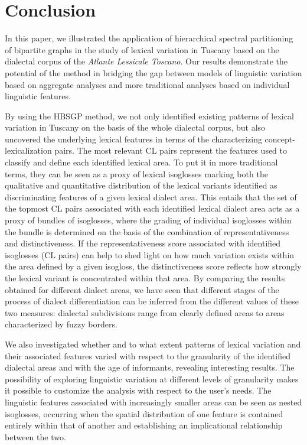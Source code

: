 \documentclass[output=paper]{LSP/langsci}
\begin{document}
\section{Conclusion}
In this paper, we illustrated the application of hierarchical spectral partitioning of bipartite graphs in the study of lexical variation in Tuscany based on the dialectal corpus of the \textit{Atlante Lessicale Toscano}. Our results demonstrate the potential of the method in bridging the gap between models of linguistic variation based on aggregate analyses and more traditional analyses based on individual linguistic features. 

By using the HBSGP method, we not only identified existing patterns of lexical variation in Tuscany on the basis of the whole dialectal corpus, but also uncovered the underlying lexical features in terms of the characterizing concept-lexicalization pairs. The most relevant CL pairs represent the features used to classify and define each identified lexical area. To put it in more traditional terms, they can be seen as a proxy of lexical isoglosses marking both the qualitative and quantitative distribution of the lexical variants identified as discriminating features of a given lexical dialect area. This entails that the set of the topmost CL pairs associated with each identified lexical dialect area acts as a proxy of bundles of isoglosses, where the grading of individual isoglosses within the bundle is determined on the basis of the combination of representativeness and distinctiveness. If the representativeness score associated with identified isoglosses (CL pairs) can help to shed light on how much variation exists within the area defined by a given isogloss, the distinctiveness score reflects how strongly the lexical variant is concentrated within that area. By comparing the results obtained for different dialect areas, we have seen that different stages of the process of dialect differentiation can be inferred from the different values of these two measures: dialectal subdivisions range from clearly defined areas to areas characterized by fuzzy borders. 

We also investigated whether and to what extent patterns of lexical variation and their associated features varied with respect to the granularity of the identified dialectal areas and with the age of informants, revealing interesting results. The possibility of exploring linguistic variation at different levels of granularity makes it possible to customize the analysis with respect to the user’s needs. The linguistic features associated with increasingly smaller areas can be seen as nested isoglosses, occurring when the spatial distribution of one feature is contained entirely within that of another and establishing an implicational relationship between the two. 
\end{document}

